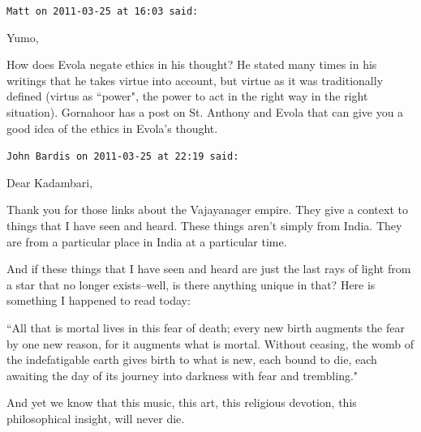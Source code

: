 \begin{footnotesize}
\begin{sffamily}
\hfill

\texttt{Matt on 2011-03-25 at 16:03 said: }

Yumo, 

How does Evola negate ethics in his thought? He stated many times in his writings that he takes virtue into account, but virtue as it was traditionally defined (virtus as ``power", the power to act in the right way in the right situation). Gornahoor has a post on St. Anthony and Evola that can give you a good idea of the ethics in Evola's thought.


\hfill

\texttt{John Bardis on 2011-03-25 at 22:19 said: }

Dear Kadambari,

Thank you for those links about the Vajayanager empire. They give a context to things that I have seen and heard. These things aren't simply from India. They are from a particular place in India at a particular time.

And if these things that I have seen and heard are just the last rays of light from a star that no longer exists–well, is there anything unique in that? Here is something I happened to read today:

``All that is mortal lives in this fear of death; every new birth augments the fear by one new reason, for it augments what is mortal. Without ceasing, the womb of the indefatigable earth gives birth to what is new, each bound to die, each awaiting the day of its journey into darkness with fear and trembling."

And yet we know that this music, this art, this religious devotion, this philosophical insight, will never die.


\end{sffamily}\end{footnotesize}
